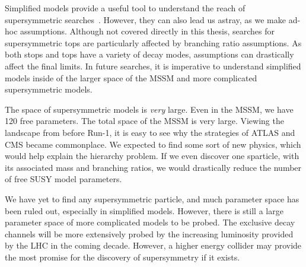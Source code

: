 Simplified models provide a useful tool to understand the reach of supersymmetric searches~\cite{whitePresusy}.
However, they can also lead us astray, as we make ad-hoc assumptions.
Although not covered directly in this thesis, searches for supersymmetric tops are particularly affected by branching ratio assumptions.
As both stops and tops have a variety of decay modes, assumptions can drastically affect the final limits.
In future searches, it is imperative to understand simplified models inside of the larger space of the MSSM and more complicated supersymmetric models.

The space of supersymmetric models is \textit{very} large.
Even in the MSSM, we have 120 free parameters.
The total space of the MSSM is very large.
Viewing the landscape from before Run-1, it is easy to see why the strategies of ATLAS and CMS became commonplace.
We expected to find some sort of new physics, which would help explain the hierarchy problem.
If we even discover one sparticle, with its associated mass and branching ratios, we would drastically reduce the number of free SUSY model parameters.

We have yet to find any supersymmetric particle, and much parameter space has been ruled out, especially in simplified models.
However, there is still a large parameter space of more complicated models to be probed.
The exclusive decay channels will be more extensively probed by the increasing luminosity provided by the LHC in the coming decade.
However, a higher energy collider may provide the most promise for the discovery of supersymmetry if it exists.

